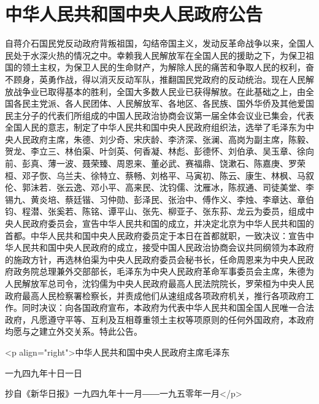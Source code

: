 \section[中华人民共和国中央人民政府公告（一九四九年十月一日）]{中华人民共和国中央人民政府公告}


自蒋介石国民党反动政府背叛祖国，勾结帝国主义，发动反革命战争以来，全国人民处于水深火热的情况之中。幸赖我人民解放军在全国人民的援助之下，为保卫祖国的领土主权，为保卫人民的生命财产，为解除人民的痛苦和争取人民的权利，奋不顾身，英勇作战，得以消灭反动军队，推翻国民党政府的反动统治。现在人民解放战争业已取得基本的胜利，全国大多数人民业已获得解放。在此基础之上，由全国各民主党派、各人民团体、人民解放军、各地区、各民族、国外华侨及其他爱国民主分子的代表们所组成的中国人民政治协商会议第一届全体会议业已集会，代表全国人民的意志，制定了中华人民共和国中央人民政府组织法，选举了毛泽东为中央人民政府主席，朱德、刘少奇、宋庆龄、李济深、张澜、高岗为副主席，陈毅、贺龙、李立三、林伯渠、叶剑英、何香凝、林彪、彭德怀、刘伯承、吴玉章、徐向前、彭真、薄一波、聂荣臻、周恩来、董必武、赛福鼎、饶漱石、陈嘉庚、罗荣桓、邓子恢、乌兰夫、徐特立、蔡畅、刘格平、马寅初、陈云、康生、林枫、马叙伦、郭沬若．张云逸、邓小平、高来民、沈钧儒、沈雁冰，陈叔通、司徒美堂、李锡九、黄炎培、蔡廷锴、习仲勋、彭泽民、张治中、傅作义、李烛、李章达、章伯钧、程潜、张奚若、陈铭、谭平山、张先、柳亚子、张东荪、龙云为委员，组成中央人民政府委员会，宣告中华人民共和国的成立，并决定北京为中华人民共和国的首都。中华人民共和国中央人民政府委员定于本日在首都就职，一致决议：宣告中华人民共和国中央人民政府的成立，接受中国人民政治协商会议共同纲领为本政府的施政方针，再选林伯渠为中央人民政府委员会秘书长，任命周恩来为中央人民政府政务院总理兼外交部部长，毛泽东为中央人民政府革命军事委员会主席，朱德为人民解放军总司令，沈钧儒为中央人民政府最高人民法院院长，罗荣桓为中央人民政府最高人民检察署检察长，并责成他们从速组成各项政府机关，推行各项政府工作。同时决议：向各国政府宣布，本政府为代表中华人民共和国全国人民唯一合法政府，凡愿遵守平等、互利及互相尊重领土主权等项原则的任何外国政府，本政府均愿与之建立外交关系。特此公告。

<p align="right">中华人民共和国中央人民政府主席毛泽东

一九四九年十日一日

抄自《新华日报》一九四九年十一月――一九五零年一月</p>


